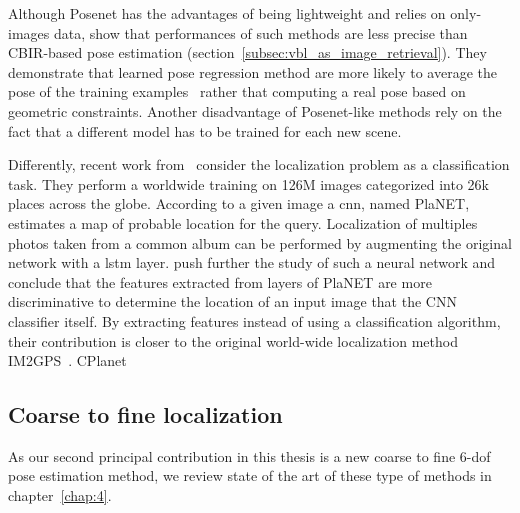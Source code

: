 Although Posenet has the advantages of being lightweight and relies on only-images data, \citet{Sattler2019} show that performances of such methods are less precise than CBIR-based pose estimation (section~\ref{subsec:vbl_as_image_retrieval}). They demonstrate that learned pose regression method are more likely to average the pose of the training examples~\citep{Torii2013} rather that computing a real pose based on geometric constraints. Another disadvantage of Posenet-like methods rely on the fact that a different model has to be trained for each new scene.

Differently, recent work from~\citet{Weyand2016} consider the localization problem as a classification task. They perform a worldwide training on 126M images categorized into 26k places across the globe. According to a given image a \ac{cnn}, named PlaNET, estimates a map of probable location for the query. Localization of multiples photos taken from a common album can be performed by augmenting the original network with a \ac{lstm} layer. \citet{Vo2017} push further the study of such a neural network and conclude that the features extracted from layers of PlaNET are more discriminative to determine the location of an input image that the CNN classifier itself. By extracting features instead of using a classification algorithm, their contribution is closer to the original world-wide localization method IM2GPS~\citep{Hays2008}. CPlanet~\citep{Seo2018}

\subsection{Coarse to fine localization}

As our second principal contribution in this thesis is a new coarse to fine 6-\ac{dof} pose estimation method, we review state of the art of these type of methods in chapter~\ref{chap:4}.
